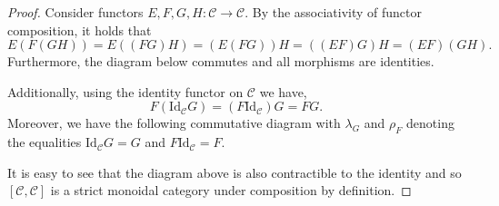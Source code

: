 \documentclass[ 12pt ]{article}
\begin{document}
\begin{enumerate}
		\begin{proof}
			Consider functors $E, F, G, H : \mathscr{C} \to \mathscr{C}$. By the associativity of functor composition, it holds that $$E(F(GH)) = E((FG)H) = (E(FG))H = ((EF)G)H = (EF)(GH).$$ Furthermore, the diagram below commutes and all morphisms are identities.
			\begin{center}
			\end{center}
			Additionally, using the identity functor on $\mathscr{C}$ we have, $$F (\mathrm{Id}_\mathscr{C} G) = (F \mathrm{Id}_\mathscr{C}) G = FG.$$ Moreover, we have the following commutative diagram with $\lambda_G$ and $\rho_F$ denoting the equalities $\mathrm{Id}_\mathscr{C} G = G$ and $F \mathrm{Id}_\mathscr{C} = F$.
			\begin{center}
			\end{center}
			It is easy to see that the diagram above is also contractible to the identity and so $[\mathscr{C}, \mathscr{C}]$ is a strict monoidal category under composition by definition. 
		\end{proof}



\end{enumerate}
\end{document}
